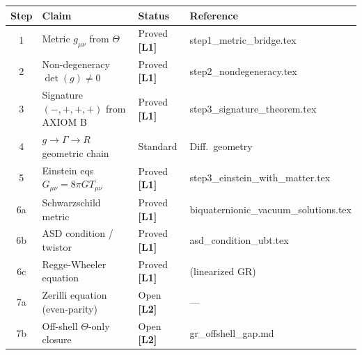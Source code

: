 \documentclass[12pt,a4paper]{article}
\theoremstyle{definition}
\theoremstyle{remark}
\newcommand{\Lone}{\textbf{[L1]}}
\newcommand{\Ltwo}{\textbf{[L2]}}
\begin{document}
\begin{tcolorbox}[colback=blue!3!white,colframe=blue!60!black,title=GR Chain: Complete Status]
\begin{center}
\begin{tabular}{clll}
\toprule
\textbf{Step} & \textbf{Claim} & \textbf{Status} & \textbf{Reference} \\
\midrule
1 & Metric $g_{\mu\nu}$ from $\Theta$ & Proved \Lone & step1\_metric\_bridge.tex \\
2 & Non-degeneracy $\det(g)\neq 0$ & Proved \Lone & step2\_nondegeneracy.tex \\
3 & Signature $(-,+,+,+)$ from AXIOM B & Proved \Lone & step3\_signature\_theorem.tex \\
4 & $g\to\Gamma\to R$ geometric chain & Standard & Diff.\ geometry \\
5 & Einstein eqs $G_{\mu\nu}=8\pi GT_{\mu\nu}$ & Proved \Lone & step3\_einstein\_with\_matter.tex \\
6a & Schwarzschild metric & Proved \Lone & biquaternionic\_vacuum\_solutions.tex \\
6b & ASD condition / twistor & Proved \Lone & asd\_condition\_ubt.tex \\
6c & Regge-Wheeler equation & Proved \Lone & (linearized GR) \\
7a & Zerilli equation (even-parity) & Open \Ltwo & — \\
7b & Off-shell $\Theta$-only closure & Open \Ltwo & gr\_offshell\_gap.md \\
\bottomrule
\end{tabular}
\end{center}
\end{tcolorbox}
\end{document}
